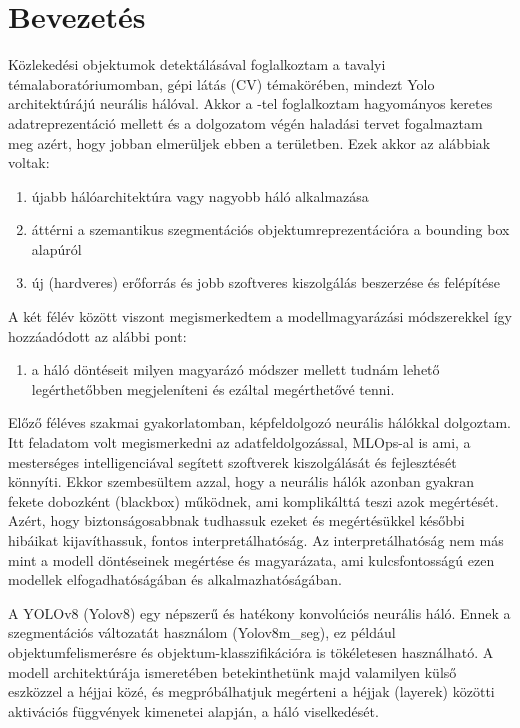 \documentclass[12pt,oneside,a4paper]{article}
\title{\titletext}
\author{Nyilas Péter}
\date{\today}
\newcommand{\newsection}[1]{\clearpage\section{#1}}\label{makro}
\theoremstyle{remark}
\begin{document}
\maketitle
\newpage
\tableofcontents\label{ossz:tartalomjegyzek}
\newpage
\newsection{Bevezetés}\label{sec:bevezetes}
\pagestyle{fancy}
    Közlekedési objektumok detektálásával foglalkoztam a tavalyi témalaboratóriumomban,
     gépi látás (\ac{CV}) témakörében, mindezt Yolo architektúrájú neurális hálóval.
    Akkor a -tel foglalkoztam hagyományos keretes adatreprezentáció mellett és a dolgozatom végén
     haladási tervet fogalmaztam meg azért, hogy jobban elmerüljek ebben a területben.
Ezek akkor az alábbiak voltak:
\begin{enumerate}[label=\alph*., start=1]\label{enum:tervek}
    \item újabb hálóarchitektúra vagy nagyobb háló alkalmazása
    \item áttérni a szemantikus szegmentációs objektumreprezentációra a bounding box alapúról
    \item új (hardveres) erőforrás és jobb szoftveres kiszolgálás beszerzése és felépítése
\end{enumerate}
A két félév között viszont megismerkedtem a modellmagyarázási módszerekkel így hozzáadódott az alábbi pont:
\begin{enumerate}[label=\alph*., start=4]
    \item a háló döntéseit milyen magyarázó módszer mellett tudnám lehető legérthetőbben megjeleníteni és ezáltal megérthetővé tenni.
\end{enumerate}

    Előző féléves szakmai gyakorlatomban, képfeldolgozó neurális hálókkal dolgoztam.
    Itt feladatom volt megismerkedni az adatfeldolgozással, MLOps-al is ami, a mesterséges intelligenciával segített szoftverek kiszolgálását
    és fejlesztését könnyíti.
    Ekkor szembesültem azzal, hogy a neurális hálók azonban gyakran fekete dobozként (blackbox) működnek,
    ami komplikálttá teszi azok megértését.
    Azért, hogy biztonságosabbnak tudhassuk ezeket
    és megértésükkel későbbi hibáikat kijavíthassuk, fontos interpretálhatóság.
    Az interpretálhatóság nem más mint a modell döntéseinek megértése
    és magyarázata, ami kulcsfontosságú ezen modellek elfogadhatóságában és alkalmazhatóságában.

    A YOLOv8 (\gls{Yolov8}) egy népszerű és hatékony konvolúciós neurális háló.
    Ennek a szegmentációs változatát használom (Yolov8m\_seg), ez
    például objektumfelismerésre és objektum-klasszifikációra is tökéletesen használható.
    A modell architektúrája ismeretében betekinthetünk majd valamilyen külső eszközzel a héjjai közé,
    és megpróbálhatjuk megérteni a héjjak (layerek) közötti aktivációs függvények kimenetei alapján, a háló viselkedését.
\end{document}
